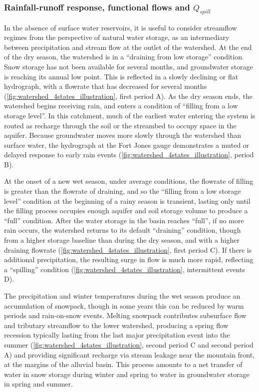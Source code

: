 \documentclass[hess, manuscript]{copernicus}
\begin{document}
\subsubsection{\texorpdfstring{Rainfall-runoff response, functional
flows and
\(Q_{spill}\)}{Rainfall-runoff response, functional flows and Q\_\{spill\}}}

In the absence of surface water reservoirs, it is useful to consider
streamflow regimes from the perspective of natural water storage, as an
intermediary between precipitation and stream flow at the outlet of the
watershed. At the end of the dry season, the watershed is in a
``draining from low storage'' condition. Snow storage has not been
available for several months, and groundwater storage is reaching its
annual low point. This is reflected in a slowly declining or flat
hydrograph, with a flowrate that has decreased for several months
(\autoref{fig:watershed_4states_illustration}, first period A). As the
dry season ends, the watershed begins receiving rain, and enters a
condition of ``filling from a low storage level''. In this catchment,
much of the earliest water entering the system is routed as recharge
through the soil or the streambed to occupy space in the aquifer.
Because groundwater moves more slowly through the watershed than surface
water, the hydrograph at the Fort Jones gauge demonstrates a muted or
delayed response to early rain events
(\autoref{fig:watershed_4states_illustration}, period B).

At the onset of a new wet season, under average conditions, the flowrate
of filling is greater than the flowrate of draining, and so the
``filling from a low storage level'' condition at the beginning of a
rainy season is transient, lasting only until the filling process
occupies enough aquifer and soil storage volume to produce a ``full''
condition. After the water storage in the basin reaches ``full'', if no
more rain occurs, the watershed returns to its default ``draining''
condition, though from a higher storage baseline than during the dry
season, and with a higher draining flowrate
(\autoref{fig:watershed_4states_illustration}, first period C). If there
is additional precipitation, the resulting surge in flow is much more
rapid, reflecting a ``spilling'' condition
(\autoref{fig:watershed_4states_illustration}, intermittent events D).

The precipitation and winter temperatures during the wet season produce
an accumulation of snowpack, though in some years this can be reduced by
warm periods and rain-on-snow events. Melting snowpack contributes
subsurface flow and tributary streamflow to the lower watershed,
producing a spring flow recession typically lasting from the last major
precipitation event into the summer
(\autoref{fig:watershed_4states_illustration}, second period C and
second period A) and providing significant recharge via stream leakage
near the mountain front, at the margins of the alluvial basin. This
process amounts to a net transfer of water in snow storage during winter
and spring to water in groundwater storage in spring and summer.
\end{document}
